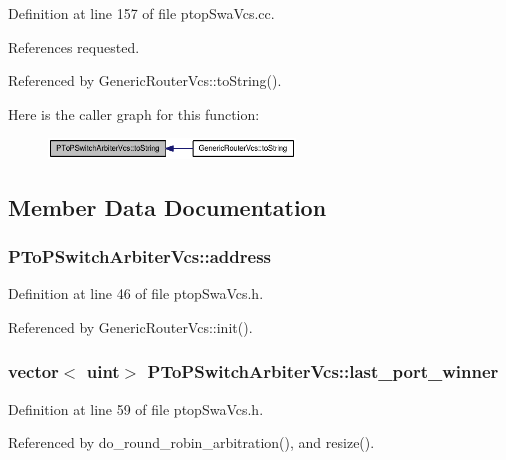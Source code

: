 Definition at line 157 of file ptopSwaVcs.cc.

References requested.

Referenced by GenericRouterVcs::toString().

Here is the caller graph for this function:\nopagebreak
\begin{figure}[H]
\begin{center}
\leavevmode
\includegraphics[width=186pt]{classPToPSwitchArbiterVcs_94cdb12d291667d5606a117417c8e339_icgraph}
\end{center}
\end{figure}


\subsection{Member Data Documentation}
\subsubsection[{address}]{ {\bf PToPSwitchArbiterVcs::address}}\label{classPToPSwitchArbiterVcs_a9a747e4c117b88e7871fc41be02d734}




Definition at line 46 of file ptopSwaVcs.h.

Referenced by GenericRouterVcs::init().
\subsubsection[{last\_\-port\_\-winner}]{\setlength{\rightskip}{0pt plus 5cm}vector$<$ {\bf uint}$>$ {\bf PToPSwitchArbiterVcs::last\_\-port\_\-winner}\hspace{0.3cm}{\tt  [private]}}\label{classPToPSwitchArbiterVcs_d8a65d4ecb52149d431ee6c29e776941}




Definition at line 59 of file ptopSwaVcs.h.

Referenced by do\_\-round\_\-robin\_\-arbitration(), and resize().
